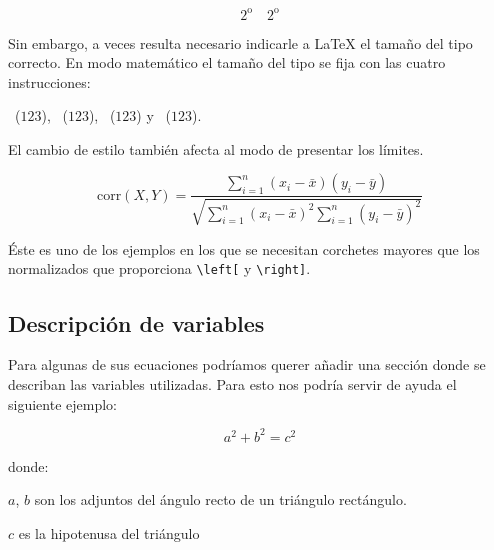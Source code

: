 \begin{example}
\begin{equation}
2^\textrm{o} \quad 
2^\mathrm{o}
\end{equation}
\end{example}

Sin  embargo,   a  veces   resulta  necesario  indicarle   a  \LaTeX{}
el    tamaño   del    tipo   correcto.    En   modo    matemático   el
tamaño   del   tipo   se    fija   con   las   cuatro   instrucciones:
\begin{flushleft}       ~($\displaystyle       123$),
~($\textstyle   123$),   ~($\scriptstyle
123$)     y     ~($\scriptscriptstyle     123$).
\end{flushleft}

El cambio de estilo también afecta al modo de presentar los límites.


\begin{example}
\begin{displaymath}
\mathrm{corr}(X,Y)= 
 \frac{\displaystyle 
   \sum_{i=1}^n(x_i-\bar x)
   (y_i-\bar y)} 
  {\displaystyle\sqrt{
 \sum_{i=1}^n(x_i-\bar x)^2
\sum_{i=1}^n(y_i-\bar y)^2}}
\end{displaymath}    
\end{example}
 
 
\noindent Éste es uno de los ejemplos en los que se necesitan
corchetes mayores que los normalizados que proporciona %
\verb|\left[| y \verb|\right]|.


\subsection{Descripción de variables}

Para algunas  de sus  ecuaciones podríamos  querer añadir  una sección
donde  se describan  las variables  utilizadas. Para  esto nos  podría
servir de ayuda el siguiente ejemplo:

\begin{example}
\begin{displaymath}
a^2+b^2=c^2
\end{displaymath}
{\settowidth{\parindent}
   {donde:\ }

$a$, $b$ son  
los adjuntos del ángulo recto
de un triángulo rectángulo.

$c$ es la hipotenusa
del triángulo}
\end{example}

